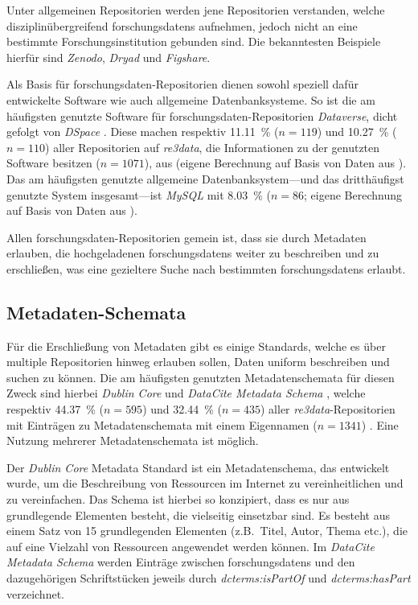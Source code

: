 Unter allgemeinen Repositorien werden jene Repositorien verstanden, welche disziplinübergreifend \glspl{forschungsdaten} aufnehmen, jedoch nicht an eine bestimmte Forschungsinstitution gebunden sind.
Die bekanntesten Beispiele hierfür sind \textit{Zenodo}, \textit{Dryad} und \textit{Figshare}.

Als Basis für \gls{forschungsdaten}-Repositorien dienen sowohl speziell dafür entwickelte Software wie auch allgemeine Datenbanksysteme.
So ist die am häufigsten genutzte Software für \gls{forschungsdaten}-Repositorien \textit{Dataverse}, dicht gefolgt von \textit{DSpace} \autocite{Khan2024}.
Diese machen respektiv \SI{11.11}{\percent} ($n=\num{119}$) und \SI{10.27}{\percent} ($n=\num{110}$) aller Repositorien auf \textit{re3data}, die Informationen zu der genutzten Software besitzen ($n=\num{1071}$), aus (eigene Berechnung auf Basis von Daten aus \autocite{Khan2024}).
Das am häufigsten genutzte allgemeine Datenbanksystem---und das dritthäufigst genutzte System insgesamt---ist \textit{MySQL} mit \SI{8.03}{\percent} ($n=\num{86}$; eigene Berechnung auf Basis von Daten aus \autocite{Khan2024}).

Allen \gls{forschungsdaten}-Repositorien gemein ist, dass sie durch Metadaten erlauben, die hochgeladenen \glspl{forschungsdaten} weiter zu beschreiben und zu erschließen, was eine gezieltere Suche nach bestimmten \glspl{forschungsdaten} erlaubt.

\subsection{Metadaten-Schemata}\label{sec:forschungsstand-basics-metadata}
Für die Erschließung von Metadaten gibt es einige Standards, welche es über multiple Repositorien hinweg erlauben sollen, Daten uniform beschreiben und suchen zu können.
Die am häufigsten genutzten Metadatenschemata für diesen Zweck sind hierbei \textit{Dublin Core} \autocite{dublincore} und \textit{DataCite Metadata Schema} \autocite{datacite}, welche respektiv \SI{44.37}{\percent} ($n=\num{595}$) und \SI{32.44}{\percent} ($n=\num{435}$) aller \textit{re3data}-Repositorien mit Einträgen zu Metadatenschemata mit einem Eigennamen ($n=\num{1341}$) \autocite{Khan2024,re3data-metadata}.
Eine Nutzung mehrerer Metadatenschemata ist möglich.

Der \textit{Dublin Core} Metadata Standard ist ein Metadatenschema, das entwickelt wurde, um die Beschreibung von Ressourcen im Internet zu vereinheitlichen und zu vereinfachen.
Das Schema ist hierbei so konzipiert, dass es nur aus grundlegende Elementen besteht, die vielseitig einsetzbar sind.
Es besteht aus einem Satz von \num{15} grundlegenden Elementen (z.B.~Titel, Autor, Thema etc.), die auf eine Vielzahl von Ressourcen angewendet werden können.
Im \textit{DataCite Metadata Schema} werden Einträge zwischen \glspl{forschungsdaten} und den dazugehörigen Schriftstücken jeweils durch \textit{dcterms:isPartOf} und \textit{dcterms:hasPart} verzeichnet.


